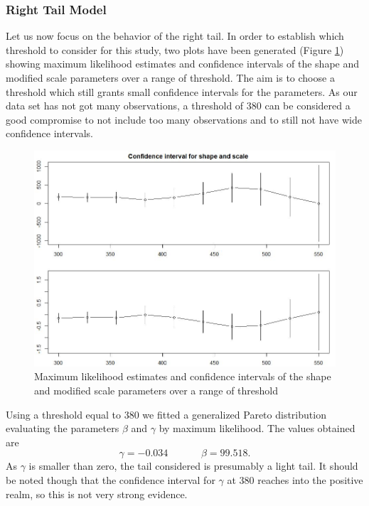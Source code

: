 \documentclass[11pt]{article}
\begin{document}
\FloatBarrier
\subsubsection*{Right Tail Model}
Let us now focus on the behavior of the right tail. In order to establish which threshold to consider for this study, two plots have been generated (Figure \ref{miaFigura1}) showing maximum likelihood estimates and confidence intervals of the shape and modified
scale parameters over a range of threshold. The aim is to choose a threshold which still grants small confidence intervals for the parameters. As our data set has not got many observations, a threshold of 380 can be considered a good compromise to not include too many observations and to still not have wide confidence intervals.

\begin{figure}[!h]
 \center
  \includegraphics[scale = 0.3]{miaFigura1.JPG}
  \caption{Maximum likelihood estimates and confidence intervals of the shape and modified
scale parameters over a range of threshold}
  \label{miaFigura1}
\end{figure}

Using a threshold equal to $380$ we fitted a generalized Pareto distribution evaluating the parameters $\beta$ and $\gamma$ by maximum likelihood. The values obtained are
$$
\gamma = -0.034 \;\;\;\;\;\;\;\;\;\;\;\; \beta = 99.518.
$$
As $\gamma$ is smaller than zero, the tail considered is presumably a light tail. It should be noted though that the confidence interval for $\gamma$ at 380 reaches into the positive realm, so this is not very strong evidence.
\end{document}
